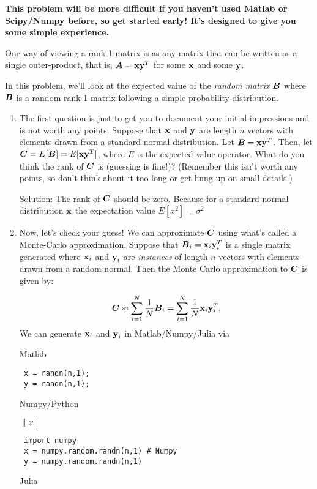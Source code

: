 \documentclass{article}
\begin{document}
\textbf{This problem will be more difficult if you haven'{}t used Matlab or Scipy/Numpy before, so get started early! It'{}s designed to give you some simple experience.}

One way of viewing a rank-1 matrix is as any matrix that can be written as a single outer-product, that is, $\boldsymbol{A} = \boldsymbol{\mathrm{x}} \boldsymbol{\mathrm{y}}^T$ for some $\boldsymbol{\mathrm{x}}$ and some $\boldsymbol{\mathrm{y}}$.

In this problem, we'{}ll look at the expected value of the \emph{random matrix} $\boldsymbol{B}$ where $\boldsymbol{B}$ is a random rank-1 matrix following a simple probability distribution.

\begin{enumerate}%
\item The first question is just to get you to document your initial impressions and is not worth any points. Suppose that $\boldsymbol{\mathrm{x}}$ and $\boldsymbol{\mathrm{y}}$ are length $n$ vectors with elements drawn from a standard normal distribution. Let $\boldsymbol{B} = \boldsymbol{\mathrm{x}} \boldsymbol{\mathrm{y}}^T$. Then, let $\boldsymbol{C} = E[\boldsymbol{B}] = E[\boldsymbol{\mathrm{x}} \boldsymbol{\mathrm{y}}^T]$, where $E$ is the expected-value operator. What do you think the rank of $\boldsymbol{C}$ is (guessing is fine!)? (Remember this isn'{}t worth any points, so don'{}t think about it too long or get hung up on small details.)

Solution:  The rank of $\boldsymbol{C}$ should be zero. Because for a standard normal distribution $\boldsymbol{\mathrm{x}}$ the expectation value  $E[x^2] = \sigma^2 $ 

\item Now, let'{}s check your guess! We can approximate $\boldsymbol{C}$ using what'{}s called a Monte-Carlo approximation. Suppose that $\boldsymbol{B}_i = \boldsymbol{\mathrm{x}}_i \boldsymbol{\mathrm{y}}_i^T$ is a single matrix generated where $\boldsymbol{\mathrm{x}}_i$ and $\boldsymbol{\mathrm{y}}_i$ are \emph{instances} of length-$n$ vectors with elements drawn from a random normal. Then the Monte Carlo approximation to $\boldsymbol{C}$ is given by:

\begin{displaymath}
\boldsymbol{C} \approx \sum_{i=1}^N \frac{1}{N} \boldsymbol{B}_i = \sum_{i=1}^N  \frac{1}{N} \boldsymbol{\mathrm{x}}_i \boldsymbol{\mathrm{y}}_i^T.
\end{displaymath}
We can generate $\boldsymbol{\mathrm{x}}_i$ and $\boldsymbol{\mathrm{y}}_i$ in Matlab/Numpy/Julia via

Matlab

\begin{verbatim} x = randn(n,1); 
 y = randn(n,1);\end{verbatim}
Numpy/Python

$\|x\|$

\begin{verbatim} import numpy
 x = numpy.random.randn(n,1) # Numpy
 y = numpy.random.randn(n,1)\end{verbatim}
Julia


\end{enumerate}
\end{document}

